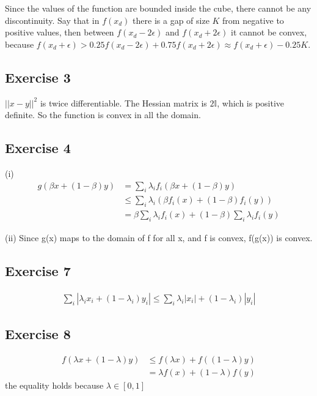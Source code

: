 \documentclass[twoside,11pt]{article}
\begin{document}
Since the values of the function are bounded inside the cube, there cannot be any discontinuity. Say that in $f(x_d)$ there is a gap of size $K$ from negative to positive values, then between $f(x_d - 2\epsilon)$ and $f(x_d + 2\epsilon)$ it cannot be convex, because $f(x_d + \epsilon) > 0.25 f(x_d - 2\epsilon) + 0.75 f(x_d + 2\epsilon) \approx f(x_d + \epsilon) - 0.25K$.

\subsection{Exercise 3}

$||x - y||^{2}$ is twice differentiable. The Hessian matrix is $2\mathbb{I}$, which is positive definite. So the function is convex in all the domain.


\subsection{Exercise 4}


(i) 
\begin{align*}
	g(\beta x + (1 -\beta) y) & = \sum_{i} \lambda_{i}f_{i}(\beta x + (1 -\beta) y) \\ 
	& \leq \sum_{i} \lambda_{i}(\beta f_{i}(x) + (1 - \beta) f_{i}(y)) \\
	& = \beta \sum_{i} \lambda_{i} f_{i}(x) + (1 - \beta) \sum_{i} \lambda_{i} f_{i} (y)
\end{align*}

(ii) Since g(x) maps to the domain of f for all x, and f is convex, f(g(x)) is convex.

\subsection{Exercise 7}

\begin{align*}
	\sum_{i} |\lambda_i x_i + (1 - \lambda_i) y_i| \leq \sum_{i} \lambda_i |x_i| + (1 - \lambda_i) |y_i|
\end{align*}

\subsection{Exercise 8}

\begin{align*}
	f(\lambda x + (1 - \lambda) y) & \leq f(\lambda x) + f((1 - \lambda) y) \\ & = \lambda f(x) + (1 - \lambda) f(y)
\end{align*}
the equality holds because $\lambda \in [0, 1]$
\end{document}
